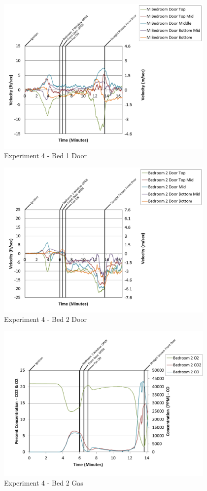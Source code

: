 \documentclass{article}
\begin{document}
\begin{appendices}
\clearpage

\begin{figure}[h!]
	\centering
	\includegraphics[height=3.05in]{0_Images/Results_Charts/Exp_4_Charts/Bed1Door.png}
	\caption{Experiment 4 - Bed 1 Door}
\end{figure}


\begin{figure}[h!]
	\centering
	\includegraphics[height=3.05in]{0_Images/Results_Charts/Exp_4_Charts/Bed2Door.png}
	\caption{Experiment 4 - Bed 2 Door}
\end{figure}

\clearpage

\begin{figure}[h!]
	\centering
	\includegraphics[height=3.05in]{0_Images/Results_Charts/Exp_4_Charts/Bed2Gas.png}
	\caption{Experiment 4 - Bed 2 Gas}
\end{figure}



\end{appendices}
\end{document}
